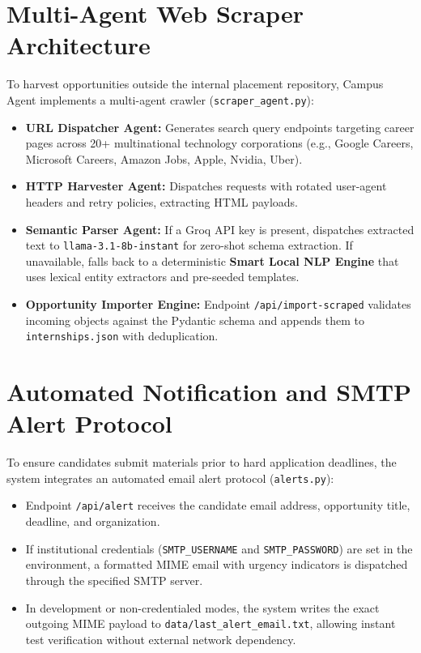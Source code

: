 \section{Multi-Agent Web Scraper Architecture} \label{S4.5}
To harvest opportunities outside the internal placement repository, Campus Agent implements a multi-agent crawler (\texttt{scraper\_agent.py}):
\begin{itemize}
	\item \textbf{URL Dispatcher Agent:} Generates search query endpoints targeting career pages across 20+ multinational technology corporations (e.g., Google Careers, Microsoft Careers, Amazon Jobs, Apple, Nvidia, Uber).
	\item \textbf{HTTP Harvester Agent:} Dispatches requests with rotated user-agent headers and retry policies, extracting HTML payloads.
	\item \textbf{Semantic Parser Agent:} If a Groq API key is present, dispatches extracted text to \texttt{llama-3.1-8b-instant} for zero-shot schema extraction. If unavailable, falls back to a deterministic \textbf{Smart Local NLP Engine} that uses lexical entity extractors and pre-seeded templates.
	\item \textbf{Opportunity Importer Engine:} Endpoint \texttt{/api/import-scraped} validates incoming objects against the Pydantic schema and appends them to \texttt{internships.json} with deduplication.
\end{itemize}

\section{Automated Notification and SMTP Alert Protocol} \label{S4.6}
To ensure candidates submit materials prior to hard application deadlines, the system integrates an automated email alert protocol (\texttt{alerts.py}):
\begin{itemize}
	\item Endpoint \texttt{/api/alert} receives the candidate email address, opportunity title, deadline, and organization.
	\item If institutional credentials (\texttt{SMTP\_USERNAME} and \texttt{SMTP\_PASSWORD}) are set in the environment, a formatted MIME email with urgency indicators is dispatched through the specified SMTP server.
	\item In development or non-credentialed modes, the system writes the exact outgoing MIME payload to \texttt{data/last\_alert\_email.txt}, allowing instant test verification without external network dependency.
\end{itemize}

